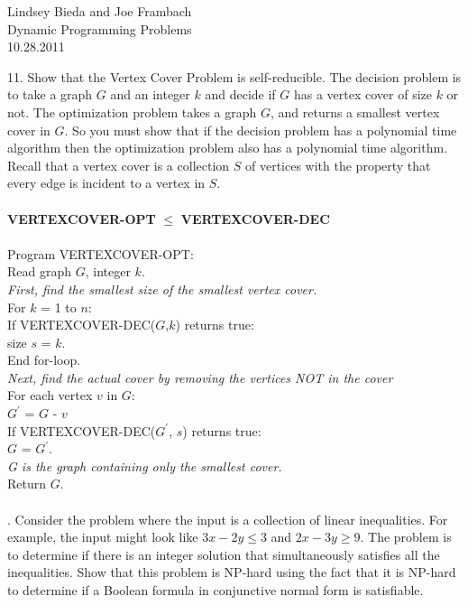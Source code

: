 \documentclass[10pt]{article}
\newcommand{\tab}{\hspace*{2em}}
\newcommand{\tabb}{\hspace*{4em}}
\newcommand{\tabbb}{\hspace*{6em}}
\begin{document}
	\begin{flushright}
	Lindsey Bieda and Joe Frambach\\
	Dynamic Programming Problems\\
	10.28.2011
	\end{flushright}
	11.  Show that the Vertex Cover Problem is self-reducible. The decision problem is to take a graph $G$ and
an integer $k$ and decide if $G$ has a vertex cover of size $k$ or not.  The optimization problem takes a
graph $G$, and returns a smallest vertex cover in $G$.  So you must show that if the decision problem
has a polynomial time algorithm then the optimization problem also has a polynomial time algorithm.
Recall that a vertex cover is a collection $S$ of vertices with the property that every edge is incident to
a vertex in $S$.\\
    \\
	\textbf{VERTEXCOVER-OPT} $\leq$ \textbf{VERTEXCOVER-DEC}\\
	\\
	Program VERTEXCOVER-OPT:\\
	\tab Read graph $G$, integer $k$.\\
	\tab \emph{First, find the smallest size of the smallest vertex cover.}\\
	\tab For $k$ = 1 to $n$:\\
	\tabb If VERTEXCOVER-DEC($G$,$k$) returns true:\\
	\tabbb size $s$ = $k$.\\
	\tabbb End for-loop.\\
	\tab \emph{Next, find the actual cover by removing the vertices NOT in the cover}\\
	\tab For each vertex $v$ in $G$:\\
	\tab  $G^\prime$ = $G$ - $v$\\
	\tabb If VERTEXCOVER-DEC($G^\prime$, $s$) returns true:\\
	\tabbb $G$ = $G^\prime$.\\
	\tab \emph{G is the graph containing only the smallest cover.}\\
	\tab Return $G$.\\
    \\
	.  Consider the problem where the input is a collection of linear inequalities.  For example, the input
might look like $3x-2y \leq 3$ and $2x-3y \geq 9$. The problem is to determine if there is an integer solution
that simultaneously satisfies all the inequalities. Show that this problem is  NP-hard using the fact that
it is NP-hard to determine if a Boolean formula in conjunctive normal form is satisfiable.
\end{document}
